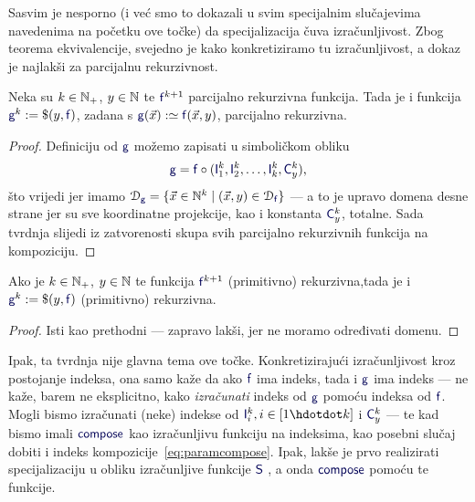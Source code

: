 Sasvim je nesporno (i već smo to dokazali u svim specijalnim slučajevima navedenima na početku ove točke) da specijalizacija čuva izračunljivost. Zbog teorema ekvivalencije, svejedno je kako konkretiziramo tu izračunljivost, a dokaz je najlakši za parcijalnu rekurzivnost.

\begin{propozicija}[{name=[specijalizacija čuva parcijalnu rekurzivnost]}]
    Neka su $k\in{\mathbb N}_+$, $y\in{\mathbb N}$ te $\f f^{k+1}$ parcijalno rekurzivna funkcija.\newline
    Tada je i funkcija $\f g^k:=\$(y,\f f)$, zadana s
    $\f g(\vec x):\simeq\f f(\vec x,y)$,
parcijalno rekurzivna.
\end{propozicija}
\begin{proof}
Definiciju od $\f g$ možemo zapisati u simboličkom obliku
\begin{equation}\label{eq:paramcompose}
    \f g=\f f\circ(\f I_1^k,\f I_2^k,\dotsc,\f I_k^k,\f C_y^k)\text,
\end{equation}
što vrijedi jer imamo $\dom{\f g}=\{\vec x\in\N^k\mid(\vec x,y)\in\dom{\f f}\}$ --- a to je upravo domena desne strane jer su sve koordinatne projekcije, kao i konstanta $\f C_y^k$, totalne. Sada tvrdnja slijedi iz zatvorenosti skupa svih parcijalno rekurzivnih funkcija na kompoziciju.
\end{proof}

\begin{korolar}[{name=[specijalizacija čuva (primitivnu) rekurzivnost]}]\label{kor:paramprn}
    Ako je $k\in{\mathbb N}_+$, $y\in{\mathbb N}$ te funkcija $\f f^{k+1}$ (primitivno) rekurzivna,\newline tada je i $\f g^k:=\$(y,\f f)$ (primitivno) rekurzivna.
\end{korolar}
\begin{proof}
Isti kao prethodni --- zapravo lakši, jer ne moramo određivati domenu.
\end{proof}

Ipak, ta tvrdnja nije glavna tema ove točke. Konkretizirajući izračunljivost kroz postojanje indeksa, ona samo kaže da ako $\f f$ ima indeks, tada i $\f g$ ima indeks --- ne kaže, barem ne eksplicitno, kako \emph{izračunati} indeks od $\f g$ pomoću indeksa od $\f f$. Mogli bismo izračunati (neke) indekse od $\f I_i^k,i\in[1\dd k]$ i $\f C_y^k$ --- te kad bismo imali $\f{compose}$ kao izračunljivu funkciju na indeksima, kao posebni slučaj dobiti i indeks kompozicije~\eqref{eq:paramcompose}. Ipak, lakše je prvo realizirati specijalizaciju u obliku izračunljive funkcije $\f S$%
, a onda $\f{compose}$ pomoću te funkcije.

